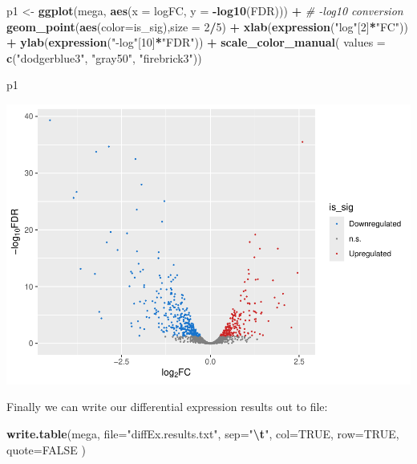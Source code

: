 \documentclass[
]{book}
\newenvironment{Shaded}{\begin{snugshade}}{\end{snugshade}}
\newcommand{\AttributeTok}[1]{\textcolor[rgb]{0.13,0.29,0.53}{#1}}
\newcommand{\CommentTok}[1]{\textcolor[rgb]{0.56,0.35,0.01}{\textit{#1}}}
\newcommand{\ConstantTok}[1]{\textcolor[rgb]{0.56,0.35,0.01}{#1}}
\newcommand{\DecValTok}[1]{\textcolor[rgb]{0.00,0.00,0.81}{#1}}
\newcommand{\FunctionTok}[1]{\textcolor[rgb]{0.13,0.29,0.53}{\textbf{#1}}}
\newcommand{\NormalTok}[1]{#1}
\newcommand{\OtherTok}[1]{\textcolor[rgb]{0.56,0.35,0.01}{#1}}
\newcommand{\SpecialCharTok}[1]{\textcolor[rgb]{0.81,0.36,0.00}{\textbf{#1}}}
\newcommand{\StringTok}[1]{\textcolor[rgb]{0.31,0.60,0.02}{#1}}
\begin{document}
\begin{Shaded}
\begin{Highlighting}[]
\NormalTok{p1 }\OtherTok{\textless{}{-}} \FunctionTok{ggplot}\NormalTok{(mega, }
    \FunctionTok{aes}\NormalTok{(}\AttributeTok{x =}\NormalTok{ logFC, }\AttributeTok{y =} \SpecialCharTok{{-}}\FunctionTok{log10}\NormalTok{(FDR))) }\SpecialCharTok{+} \CommentTok{\# {-}log10 conversion  }
    \FunctionTok{geom\_point}\NormalTok{(}\FunctionTok{aes}\NormalTok{(}\AttributeTok{color=}\NormalTok{is\_sig),}\AttributeTok{size =} \DecValTok{2}\SpecialCharTok{/}\DecValTok{5}\NormalTok{) }\SpecialCharTok{+}  
    \FunctionTok{xlab}\NormalTok{(}\FunctionTok{expression}\NormalTok{(}\StringTok{"log"}\NormalTok{[}\DecValTok{2}\NormalTok{]}\SpecialCharTok{*}\StringTok{"FC"}\NormalTok{)) }\SpecialCharTok{+} 
    \FunctionTok{ylab}\NormalTok{(}\FunctionTok{expression}\NormalTok{(}\StringTok{"{-}log"}\NormalTok{[}\DecValTok{10}\NormalTok{]}\SpecialCharTok{*}\StringTok{"FDR"}\NormalTok{)) }\SpecialCharTok{+} 
    \FunctionTok{scale\_color\_manual}\NormalTok{(}
        \AttributeTok{values =} \FunctionTok{c}\NormalTok{(}\StringTok{"dodgerblue3"}\NormalTok{, }\StringTok{"gray50"}\NormalTok{, }\StringTok{"firebrick3"}\NormalTok{)) }

\NormalTok{p1}
\end{Highlighting}
\end{Shaded}

\includegraphics{_main_files/figure-latex/unnamed-chunk-107-1.pdf}

Finally we can write our differential expression results out to file:

\begin{Shaded}
\begin{Highlighting}[]
\FunctionTok{write.table}\NormalTok{(mega,}
    \AttributeTok{file=}\StringTok{"diffEx.results.txt"}\NormalTok{,}
    \AttributeTok{sep=}\StringTok{"}\SpecialCharTok{\textbackslash{}t}\StringTok{"}\NormalTok{,}
    \AttributeTok{col=}\ConstantTok{TRUE}\NormalTok{,}
    \AttributeTok{row=}\ConstantTok{TRUE}\NormalTok{,}
    \AttributeTok{quote=}\ConstantTok{FALSE}
\NormalTok{)}
\end{Highlighting}
\end{Shaded}
\end{document}
